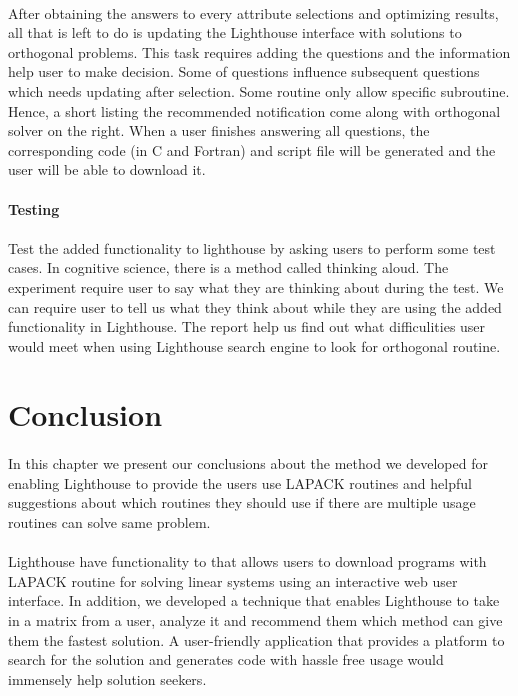 \documentclass[pdftex,12pt,a4paper]{article}
\begin{document}
\paragraph{}
After obtaining the answers to every attribute selections and optimizing results, all that is left to do is updating the Lighthouse interface with solutions to orthogonal problems. This task requires adding the questions and the information help user to make decision. Some of questions influence subsequent questions which needs updating after selection. Some routine only allow specific subroutine. Hence, a short listing the recommended notification come along with orthogonal solver on the right. When a user finishes answering all questions, the corresponding code (in C and Fortran) and script file will be generated and the user will be able to download it. \\
\\
\textbf{Testing}
\paragraph{}
Test the added functionality to lighthouse by asking users to perform some test cases. In cognitive science, there is a method called thinking aloud. The experiment require user to say what they are thinking about during the test. We can require user to tell us what they think about while they are using the added functionality in Lighthouse. The report help us find out what difficulities user would meet when using Lighthouse search engine to look for orthogonal routine. 

\section{Conclusion}
\paragraph{}
In this chapter we present our conclusions about the method we developed for enabling Lighthouse to provide the users use LAPACK routines and helpful suggestions about which routines they should use if there are multiple usage routines can solve same problem. 
\paragraph{}
Lighthouse have functionality to that allows users to download programs with LAPACK routine for solving linear systems using an interactive web user interface. In addition, we developed a technique that enables Lighthouse to take in a matrix from a user, analyze it and recommend them which method can give them the fastest solution. A user-friendly application that provides a platform to search for the solution and generates code with hassle free usage would immensely help solution seekers. 
\end{document}
